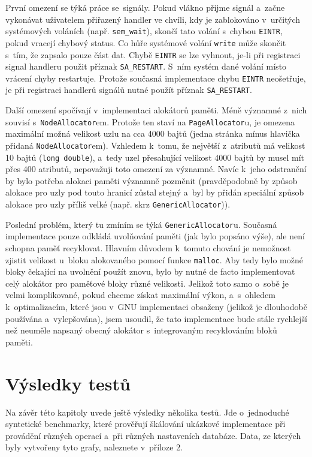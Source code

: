 První omezení se týká práce se~signály. Pokud vlákno přijme signál a~začne vykonávat
uživatelem přiřazený handler ve chvíli, kdy je zablokováno v~určitých systémových
voláních (např. \verb|sem_wait|), skončí tato volání s~chybou
\verb|EINTR|, pokud vracejí chybový status. Co hůře systémové volání \verb|write|
může skončit
s~tím, že zapsalo pouze část dat. Chybě \verb|EINTR| se lze vyhnout, je-li při
registraci signal handleru použit příznak \verb|SA_RESTART|. S~ním systém dané volání
místo vrácení chyby restartuje. Protože současná implementace chybu \verb|EINTR|
neošetřuje, je při registraci handlerů signálů nutné použít příznak \verb|SA_RESTART|.

Další omezení spočívají v~implementaci alokátorů paměti. Méně významné z~nich souvisí
s~\verb|NodeAllocator|em. Protože ten staví na \verb|PageAllocator|u, je omezena
maximální možná velikost uzlu na cca 4000 bajtů (jedna stránka mínus hlavička přidaná
\verb|NodeAllocator|em). Vzhledem k~tomu, že největší z~atributů má velikost
10 bajtů (\verb|long double|), a~tedy uzel přesahující velikost 4000 bajtů by musel
mít přes 400 atributů, nepovažuji toto omezení za významné. Navíc k~jeho odstranění
by bylo potřeba alokaci paměti významně pozměnit (pravděpodobně by způsob alokace pro
uzly pod touto hranicí zůstal stejný a~byl by přidán speciální způsob alokace pro uzly
příliš velké (např. skrz \verb|GenericAllocator|)).

Poslední problém, který tu zmíním se týká \verb|GenericAllocator|u.
Současná implementace pouze odkládá uvolňování paměti (jak bylo popsáno výše), ale
není schopna paměť recyklovat. Hlavním důvodem k~tomuto chování je nemožnost zjistit
velikost u~bloku alokovaného pomocí funkce \verb|malloc|. Aby tedy bylo možné
bloky čekající na uvolnění použít znovu, bylo by nutné de facto implementovat
celý alokátor pro paměťové bloky různé velikosti. Jelikož toto samo o~sobě je
velmi komplikované, pokud chceme získat maximální výkon, a~s~ohledem k~optimalizacím,
které jsou v~GNU implementaci obsaženy (jelikož je dlouhodobě používána a~vylepšována),
jsem usoudil, že tato implementace bude stále rychlejší než neuměle napsaný obecný
alokátor s~integrovaným recyklováním bloků paměti.

\section{Výsledky testů}
Na závěr této kapitoly uvede ještě výsledky několika testů. Jde o~jednoduché syntetické
benchmarky, které prověřují škálování ukázkové implementace při provádění různých
operací a~při různých nastaveních databáze. Data, ze kterých byly vytvořeny tyto grafy,
naleznete v~příloze 2.

